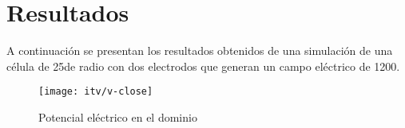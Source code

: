 
\newpage

\section{Resultados}
A continuación se presentan los resultados obtenidos de una simulación de una célula de 25\um de radio con dos electrodos que generan un campo eléctrico de 1200\vcm.\\


\newcommand{\dobleimagen}[6] {
	\begin{figure} \centering
		\begin{minipage}{.5\textwidth}
			\centering
			\texttt{[image: \#1]}
			\captionof{figure}{#3}
			\label{fig:#2}
		\end{minipage}%
		\begin{minipage}{.5\textwidth}
			\centering
			\texttt{[image: \#4]}
			\captionof{figure}{#6}
			\label{fig:#5}
		\end{minipage}
	\end{figure}
}

\newcommand{\dobleimagengrande}[6] {
	\begin{figure} 
	\makebox[\textwidth][c] {
		\centering
		\begin{minipage}{.40\paperwidth}
			\centering
			\texttt{[image: \#1]}
			\captionof{figure}{#3}
			\label{fig:#2}
		\end{minipage}%
		\begin{minipage}{.40\paperwidth}
			\centering
			\texttt{[image: \#4]}
			\captionof{figure}{#6}
			\label{fig:#5}
		\end{minipage}
	}
	\end{figure}
}


\begin{wrapfigure}{r}{0.5\textwidth}
  \begin{center}
    \texttt{[image: itv/v-close]}
  \end{center}
  \caption{Potencial eléctrico en el dominio}
  \label{fig:pote}
\end{wrapfigure}

